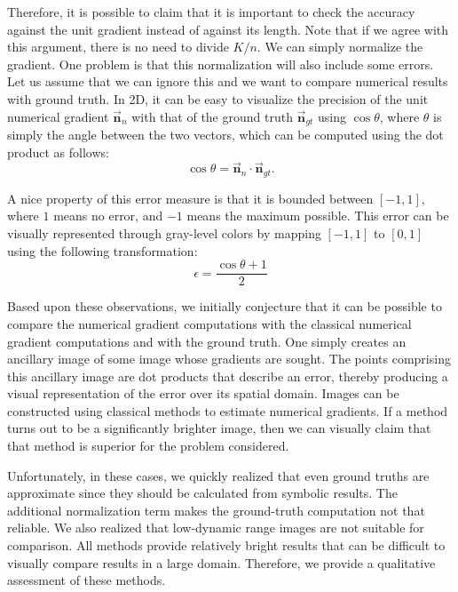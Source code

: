 \documentclass{article}
\begin{document}
Therefore, it is possible to claim that it is important to check the accuracy against the unit gradient instead of against its length. Note that if we agree with this argument, there is no need to divide $K/n$. We can simply normalize the gradient. One problem is that this normalization will also include some errors. Let us assume that we can ignore this and we want to compare numerical results with ground truth. In 2D, it can be easy  to visualize the precision of the unit numerical gradient $\vec{\mathbf{n}}_n$ with that of the ground truth $\vec{\mathbf{n}}_{gt}$ using $\cos \theta$, where $\theta$ is simply the angle between the two vectors, which can be computed using the dot product as follows:
$$\cos \theta = \vec{\mathbf{n}}_n \cdot \vec{\mathbf{n}}_{gt} . $$

A nice property of this error measure is that it is bounded between $[-1,1]$, where $1$ means no error, and $-1$ means the maximum possible. This error can be visually represented through gray-level colors by mapping $[-1,1]$ to $[0,1]$ using the following transformation:
$$\epsilon = \frac{\cos \theta + 1}{2}$$

Based upon these observations, we initially conjecture that it can be possible to compare the numerical gradient computations with the classical numerical gradient computations and with the ground truth. One simply creates an ancillary image of some image whose gradients are sought.  The points comprising this ancillary image are dot products that describe an error, thereby producing a visual representation of the error over its spatial domain.  Images can be constructed using classical methods to estimate numerical gradients. If a method turns out to be a significantly brighter image, then we can visually claim that that method is superior for the problem considered.

Unfortunately, in these cases, we quickly realized that even ground truths are approximate since they should be calculated from symbolic results. The additional normalization term makes the ground-truth computation not that reliable. We also realized that low-dynamic range images are not suitable for comparison. All methods provide relatively bright results that can be difficult to visually compare results in a large domain. Therefore, we provide a qualitative assessment of these methods. 
\end{document}
